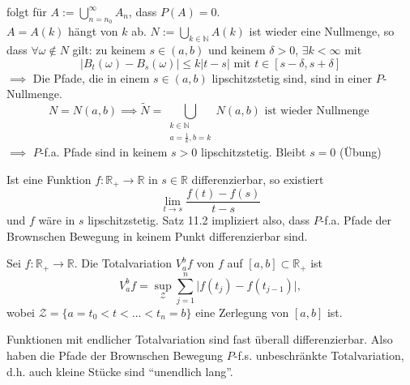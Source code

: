 \documentclass[a4paper,twoside,DIV15,BCOR12mm]{scrbook}
\begin{document}
\begin{beweis}
folgt für $A:=\bigcup_{n=n_0}^\infty A_n$, dass $P(A)=0$. \\
$A=A(k)$ hängt von $k$ ab. $N:=\bigcup_{k\in\mathbb N}A(k)$ ist wieder eine Nullmenge, so dass
$\forall \omega\notin N$ gilt: zu keinem $s\in(a,b)$ und keinem $\delta > 0$, $\exists k<\infty$ mit
\[
\vert B_t(\omega)-B_s(\omega)\vert\leq k\vert t-s\vert\text{ mit }t\in[s-\delta,s+\delta]
\]
$\implies$ Die Pfade, die in einem $s\in (a,b)$ lipschitzstetig sind, sind in einer $P$-Nullmenge. \\
 \[ 
N=N(a,b)\implies\tilde{N}=\bigcup_{\begin{array}{c} k\in\mathbb N \\ a=\frac{1}{k},b=k \end{array}} N(a,b)\text{ ist wieder Nullmenge }
\]
$\implies$ $P$-f.a. Pfade sind in keinem $s>0$ lipschitzstetig. Bleibt $s=0$ (Übung)  

\end{beweis}

\begin{bemerkung}
  Ist eine Funktion $f:\mathbb R_+\longrightarrow\mathbb R$ in $s\in \mathbb R$ differenzierbar, so existiert
\[
\lim_{t\rightarrow s}\frac{f(t)-f(s)}{t-s}
\]
und $f$ wäre in $s$ lipschitzstetig. Satz 11.2 impliziert also, dass $P$-f.a. Pfade der Brownschen Bewegung in keinem Punkt differenzierbar sind.
\end{bemerkung}

\begin{definition}
  Sei $f:\mathbb R_+\longrightarrow\mathbb R$. Die Totalvariation $V_a^b f$ von $f$ auf $[a,b]\subset\mathbb R_+$ ist
\[
V_a^bf=\sup_{\mathcal Z}\sum_{j=1}^n\vert f(t_j)-f(t_{j-1})\vert,
\]
wobei $\mathcal Z=\{a=t_0<t<\dots<t_n=b\}$ eine Zerlegung von $[a,b]$ ist.
\end{definition}

\begin{bemerkung}
  Funktionen mit endlicher Totalvariation sind fast überall differenzierbar. Also haben die Pfade der Brownschen Bewegung $P$-f.s. unbeschränkte Totalvariation, d.h. auch kleine Stücke sind ``unendlich lang''.
\end{bemerkung}
\end{document}
